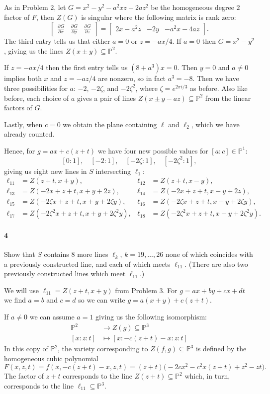 \documentclass[12pt]{article}
\newlength{\myparskip}
\newenvironment{fullbox}{\begin{lrbox}{\savefullbox}\begin{minipage}{\dimexpr\textwidth-2\fboxsep\relax}\setlength{\parskip}{\myparskip}}{\end{minipage}\end{lrbox}\framebox[\textwidth]{\usebox{\savefullbox}}}
\newenvironment{pbox}[1][]{\begin{fullbox}\ifx#1\empty\else\paragraph{#1}\phantom{}\fi}{\end{fullbox}}
\theoremstyle{definition}
\renewcommand{\P}{\mathbb{P}}
\newcommand{\<}{\langle}
\renewcommand{\>}{\rangle}
\newcommand{\mat}[1]{\begin{bmatrix}#1\end{bmatrix}}
\newcommand{\pdv}[3][]{\frac{\partial^{#1}#2}{\partial{#3}^{#1}}}
\begin{document}
As in Problem 2, let $G = x^2 - y^2 - a^2xz - 2az^2$ be the homogeneous degree $2$ factor of $F$, then $Z(G)$ is singular where the following matrix is rank zero:
\[
    \mat{\pdv{G}{x} & \pdv{G}{y} & \pdv{G}{z}} 
        = \mat{2x - a^2z & -2y & -a^2x - 4az}.
\]
The third entry tells us that either $a = 0$ or $z = -ax/4$.
If $a = 0$ then $G = x^2 - y^2$, giving us the lines $Z(x \pm y) \subseteq \P^2$.

If $z = -ax/4$ then the first entry tells us $(8 + a^3)x = 0$.
Then $y = 0$ and $a \ne 0$ implies both $x$ and $z = -az/4$ are nonzero, so in fact $a^3 = -8$.
Then we have three possibilities for $a$: $-2$, $-2\zeta$, and $-2\zeta^2$, where $\zeta = e^{2\pi i/3}$ as before.
Also like before, each choice of $a$ gives a pair of lines $Z(x \pm y - az) \subseteq \P^2$ from the linear factors of $G$.

Lastly, when $c = 0$ we obtain the plane containing $\ell$ and $\ell_2$, which we have already counted.

Hence, for $g = ax + c(z + t)$ we have four new possible values for $[a : c] \in \P^1$:
\[
    [0 : 1], \quad [-2 : 1], \quad [-2\zeta : 1], \quad [-2\zeta^2 : 1],
\]
giving us eight new lines in $S$ intersecting $\ell_1$:
\begin{align*}
    \ell_{11} &= Z(z + t, x + y), & \ell_{12} &= Z(z + t, x - y), \\
    \ell_{13} &= Z(-2x + z + t, x + y + 2z), & \ell_{14} &= Z(-2x + z + t, x - y + 2z), \\
    \ell_{15} &= Z(-2\zeta x + z + t, x + y + 2\zeta y), & \ell_{16} &= Z(-2\zeta x + z + t, x - y + 2\zeta y), \\
    \ell_{17} &= Z(-2\zeta^2 x + z + t, x + y + 2\zeta^2 y), & \ell_{18} &= Z(-2\zeta^2 x + z + t, x - y + 2\zeta^2 y).
\end{align*}


\newpage
\begin{pbox}[4]
    Show that $S$ contains $8$ more lines $\ell_k$, $k = 19, \dots, 26$ none of which coincides with a previously constructed line, and each of which meets $\ell_{11}$.
    (There are also two previously constructed lines which meet $\ell_{11}$.)
\end{pbox}

We will use $\ell_{11} = Z(z + t, x + y)$ from Problem 3.
For $g = ax + by + cx + dt$ we find $a = b $ and $c = d$ so we can write $g = a(x + y) + c(z + t)$.

If $a \ne 0$ we can assume $a = 1$ giving us the following isomorphism:
\begin{align*}
    \P^2 &\longrightarrow Z(g) \subseteq \P^3 \\
    [x : z : t] &\longmapsto [x : -c(z + t) - x : z : t]
\end{align*}
In this copy of $\P^2$, the variety corresponding to $Z(f, g) \subseteq \P^3$ is defined by the homogeneous cubic polynomial
\[
    F(x, z, t)
        = f(x, -c(z + t) - x, z, t)
        = (z + t) \big(-2cx^2 - c^2x(z + t) + z^2 - zt\big).
\]
The factor of $z + t$ corresponds to the line $Z(z + t) \subseteq \P^2$ which, in turn, corresponds to the line $\ell_{11} \subseteq \P^3$.
\end{document}

